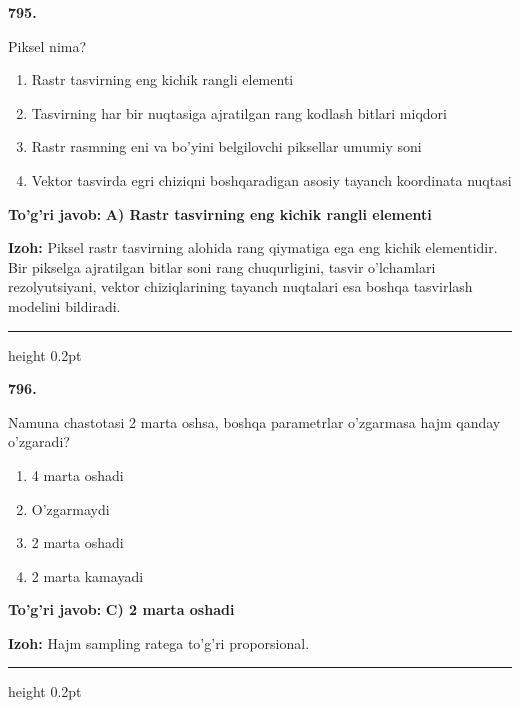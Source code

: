 \documentclass[10pt,a4paper,oneside]{article}
\begin{document}
\noindent\textbf{\color{ink}795.}
\par
Piksel nima?
\begin{enumerate}[label=\Alph*),leftmargin=9mm]
\item Rastr tasvirning eng kichik rangli elementi
\item Tasvirning har bir nuqtasiga ajratilgan rang kodlash bitlari miqdori
\item Rastr rasmning eni va bo'yini belgilovchi piksellar umumiy soni
\item Vektor tasvirda egri chiziqni boshqaradigan asosiy tayanch koordinata nuqtasi
\end{enumerate}
\begin{tcolorbox}[enhanced,breakable,colback=teal!4,colframe=teal!50!black,boxrule=0.5pt,arc=1.1mm,left=3mm,right=3mm,top=1.7mm,bottom=1.7mm,before skip=2mm,after skip=2mm]
\textbf{\color{teal}To'g'ri javob:} \textbf{A) Rastr tasvirning eng kichik rangli elementi}
\par\smallskip
\textbf{Izoh:} Piksel rastr tasvirning alohida rang qiymatiga ega eng kichik elementidir. Bir pikselga ajratilgan bitlar soni rang chuqurligini, tasvir o'lchamlari rezolyutsiyani, vektor chiziqlarining tayanch nuqtalari esa boshqa tasvirlash modelini bildiradi.
\end{tcolorbox}
\vspace{2mm}\hrule height 0.2pt \vspace{3mm}

\noindent\textbf{\color{ink}796.}
\par
Namuna chastotasi 2 marta oshsa, boshqa parametrlar o'zgarmasa hajm qanday o'zgaradi?
\begin{enumerate}[label=\Alph*),leftmargin=9mm]
\item 4 marta oshadi
\item O'zgarmaydi
\item 2 marta oshadi
\item 2 marta kamayadi
\end{enumerate}
\begin{tcolorbox}[enhanced,breakable,colback=teal!4,colframe=teal!50!black,boxrule=0.5pt,arc=1.1mm,left=3mm,right=3mm,top=1.7mm,bottom=1.7mm,before skip=2mm,after skip=2mm]
\textbf{\color{teal}To'g'ri javob:} \textbf{C) 2 marta oshadi}
\par\smallskip
\textbf{Izoh:} Hajm sampling ratega to'g'ri proporsional.
\end{tcolorbox}
\vspace{2mm}\hrule height 0.2pt \vspace{3mm}
\end{document}
